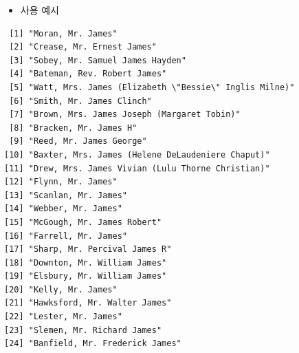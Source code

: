 \documentclass[
  11pt,
]{krantz}
\newenvironment{Shaded}{\begin{snugshade}}{\end{snugshade}}
\newcommand{\AttributeTok}[1]{\textcolor[rgb]{0.61,0.61,0.61}{#1}}
\newcommand{\CommentTok}[1]{\textcolor[rgb]{0.37,0.37,0.37}{\textit{#1}}}
\newcommand{\ConstantTok}[1]{\textcolor[rgb]{0,0,0}{#1}}
\newcommand{\FunctionTok}[1]{\textcolor[rgb]{0,0,0}{#1}}
\newcommand{\NormalTok}[1]{#1}
\newcommand{\OtherTok}[1]{\textcolor[rgb]{0.37,0.37,0.37}{#1}}
\newcommand{\SpecialCharTok}[1]{\textcolor[rgb]{0,0,0}{#1}}
\newcommand{\StringTok}[1]{\textcolor[rgb]{0.5,0.5,0.5}{#1}}
\providecommand{\tightlist}{%
  \setlength{\itemsep}{0pt}\setlength{\parskip}{0pt}}
\begin{document}
\normalsize

\begin{itemize}
\tightlist
\item
  사용 예시
\end{itemize}

\footnotesize

\begin{Shaded}
\end{Shaded}

\begin{verbatim}
 [1] "Moran, Mr. James"                                    
 [2] "Crease, Mr. Ernest James"                            
 [3] "Sobey, Mr. Samuel James Hayden"                      
 [4] "Bateman, Rev. Robert James"                          
 [5] "Watt, Mrs. James (Elizabeth \"Bessie\" Inglis Milne)"
 [6] "Smith, Mr. James Clinch"                             
 [7] "Brown, Mrs. James Joseph (Margaret Tobin)"           
 [8] "Bracken, Mr. James H"                                
 [9] "Reed, Mr. James George"                              
[10] "Baxter, Mrs. James (Helene DeLaudeniere Chaput)"     
[11] "Drew, Mrs. James Vivian (Lulu Thorne Christian)"     
[12] "Flynn, Mr. James"                                    
[13] "Scanlan, Mr. James"                                  
[14] "Webber, Mr. James"                                   
[15] "McGough, Mr. James Robert"                           
[16] "Farrell, Mr. James"                                  
[17] "Sharp, Mr. Percival James R"                         
[18] "Downton, Mr. William James"                          
[19] "Elsbury, Mr. William James"                          
[20] "Kelly, Mr. James"                                    
[21] "Hawksford, Mr. Walter James"                         
[22] "Lester, Mr. James"                                   
[23] "Slemen, Mr. Richard James"                           
[24] "Banfield, Mr. Frederick James"                       
\end{verbatim}
\end{document}
